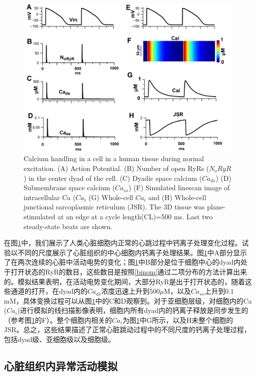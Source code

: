 \begin{figure}[htb]
\includegraphics[width=\textwidth]{figs/calcium.pdf}
\caption{Calcium handling in a cell in a human tissue during normal excitation. (A) Action Potential. (B) Number of open RyRs ($N_oRyR$) in the center dyad of the cell. (C) Dyadic space calcium ($Ca_{ds}$) (D) Submembrane space calcium ($Ca_{ss}$) (F) Simulated linescan image of intracellular Ca ($Ca_i$ (G) Whole-cell $Ca_i$ and (H) Whole-cell junctional sarcoplasmic reticulum (JSR). The 3D tissue was plane-stimulated at an edge at a cycle length(CL)=500 ms. Last two steady-state beats are shown.}
\label{fig:calciumcell}
\end{figure}

在图\ref{fig:calciumcell}中，我们展示了人类心脏细胞内正常的心跳过程中钙离子处理变化过程。试验以不同的尺度展示了心脏组织的中心细胞内钙离子处理结果。图\ref{fig:calciumcell}中A部分显示了在两次连续的心脏中活动电势的变化；图\ref{fig:calciumcell}中B部分是位于细胞中心的dyad内处于打开状态的RyR的数目，这些数目是按照\ref{binom}通过二项分布的方法计算出来的。模拟结果表明，在活动电势变化期间，大部分RyR是出于打开状态的，随着这些通道的打开，在dyad内的$Ca_{ds}$浓度迅速上升到$500\mu$M，以及$Ca_{ss}$上升到$0.1$mM，具体变换过程可以从图\ref{fig:calciumcell}中的C和D观察到。对于亚细胞层级，对细胞内的Ca ($Ca_{i}$)进行模拟的线扫描影像表明，细胞内所有dyad内的钙离子释放是同步发生的（参考图\ref{fig:calciumcell}的F）。整个细胞内相关的$Ca_i$为图\ref{fig:calciumcell}中G所示，以及H未整个细胞的JSR。总之，这些结果描述了正常心脏跳动过程中的不同尺度的钙离子处理过程，包括dyad级、亚细胞级以及细胞级。

\subsection{心脏组织内异常活动模拟}

